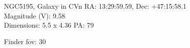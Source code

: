 \begin{block}{NGC5195, Galaxy in CVn}
    RA: 13:29:59.59, Dec: +47:15:58.1 \\ 
    Magnitude (V): 9.58 \\ 
    Dimensions: 5.5 x 4.36 PA: 79 

    Finder fov: 30 
\end{block}